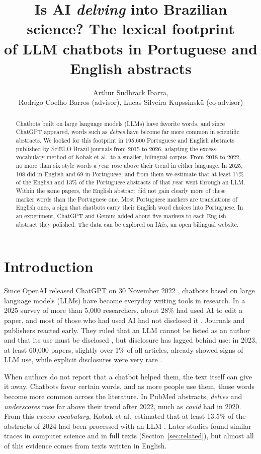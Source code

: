 \documentclass[12pt]{article}
\title{Is AI \textit{delving} into Brazilian science? The lexical footprint\\
  of LLM chatbots in Portuguese and English abstracts}
\author{Arthur Sudbrack Ibarra\inst{1},\\
  Rodrigo Coelho Barros\inst{1} (advisor),
  Lucas Silveira Kupssinskü\inst{1} (co-advisor)}
\newcommand{\w}[1]{\textit{#1}}
\begin{document}
\maketitle

\begin{abstract}
  Chatbots built on large language models (LLMs) have favorite words, and since ChatGPT appeared,
  words such as \emph{delves} have become far more common in scientific abstracts. We looked for
  this footprint in 195,600 Portuguese and English abstracts published by SciELO Brazil journals
  from 2015 to 2026, adapting the excess-vocabulary method of Kobak et al.\ to a smaller, bilingual
  corpus. From 2018 to 2022, no more than six style words a year rose above their trend in either
  language. In 2025, 108 did in
  English and 69 in Portuguese, and from them we estimate that at least 17\% of the English and 13\%
  of the Portuguese abstracts of that year went through an LLM. Within the same papers, the English
  abstract did not gain clearly more of these marker words than the Portuguese one. Most Portuguese
  markers are translations of English ones, a sign that chatbots carry their English word choices
  into Portuguese. In an experiment, ChatGPT and Gemini added about five markers to each English
  abstract they polished. The data can be explored on IAês, an open bilingual website.
\end{abstract}

\section{Introduction}
\label{sec:intro}

Since OpenAI released ChatGPT on 30 November 2022 \cite{openai2022chatgpt}, chatbots based on large
language models (LLMs) have become everyday writing tools in research. In a 2025 survey of more
than 5,000 researchers, about 28\% had used AI to edit a paper, and most of those who had used AI
had not disclosed it \cite{kwon2025ok}. Journals and publishers reacted early. They ruled that an
LLM cannot be listed as an author and that its use must be disclosed \cite{nature2023tools}, but
disclosure has lagged behind use: in 2023, at least 60,000 papers, slightly over 1\% of all
articles, already showed signs of LLM use, while explicit disclosures were very rare
\cite{gray2024contamination}.

When authors do not report that a chatbot helped them, the text itself can give it away. Chatbots
favor certain words, and as more people use them, those words become more common across the
literature. In PubMed abstracts, \w{delves} and \w{underscores} rose far above their trend after
2022, much as \w{covid} had in 2020. From this \emph{excess vocabulary}, Kobak et al.\ estimated that
at least 13.5\% of the abstracts of 2024 had been processed with an LLM \cite{kobak2025delving}.
Later studies found similar traces in computer science and in full texts
(Section~\ref{sec:related}), but almost all of this evidence comes from texts written in English.
\end{document}

